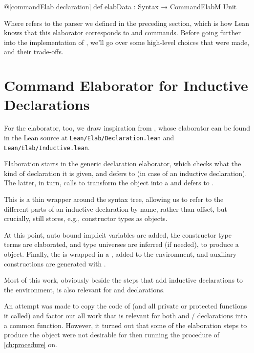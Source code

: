 \begin{leancode}
  @[commandElab declaration] def elabData : Syntax → CommandElabM Unit
\end{leancode}

Where  refers to the parser we defined in the preceding section, which is how Lean
knows that this elaborator corresponds to \data{} and \codata{} commands.
Before going further into the implementation of , we'll go over some high-level choices 
that were made, and their trade-offs.


\section{Command Elaborator for Inductive Declarations}
For the elaborator, too, we draw inspiration from \inductive{}, whose elaborator can be found in the Lean source at \texttt{Lean/Elab/Declaration.lean} and \texttt{Lean/Elab/Inductive.lean}.

Elaboration starts in the generic declaration elaborator, which checks what the kind of declaration it is given, and defers to  (in case of an inductive declaration). The latter, in turn, calls  to transform the  object into a  and defers to .

This  is a thin wrapper around the syntax tree, allowing us to refer to the different parts of an inductive declaration by name, rather than offset, but crucially, still stores, e.g., constructor types as  objects.

At this point, auto bound implicit variables are added, the constructor type terms are elaborated, and type universes are inferred (if needed), to produce a  object. 
Finally, the  is wrapped in a , added to the environment, and auxiliary constructions are generated with .


Most of this work, obviously beside the steps that add inductive declarations to the environment, is also relevant for \data{} and \codata{} declarations.

An attempt was made to copy the code of  (and all private or protected functions it called) and factor out all work that is relevant for both \inductive{} and \data{}/\codata{} declarations into a common function.
However, it turned out that some of the elaboration steps to produce the  object were not desirable for then running the procedure of \cref{ch:procedure} on.

